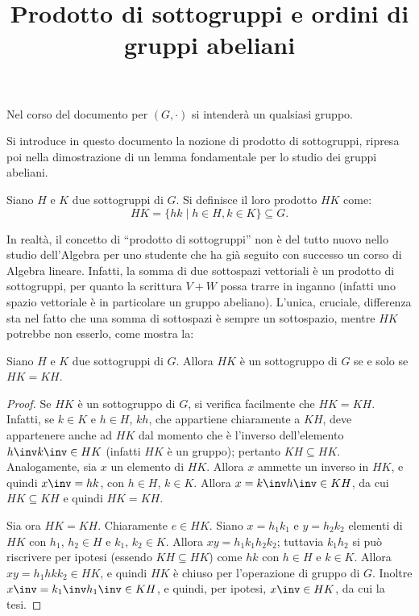 \documentclass[12pt]{scrartcl}
\begin{document}
	\title{Prodotto di sottogruppi e ordini di gruppi abeliani}
	\maketitle

	\begin{note}
		Nel corso del documento per $(G, \cdot)$ si intenderà un qualsiasi gruppo.
	\end{note}

	Si introduce in questo documento la nozione di prodotto
	di sottogruppi, ripresa poi nella dimostrazione di un
	lemma fondamentale per lo studio dei gruppi abeliani.
	
	\begin{definition}
		Siano $H$ e $K$ due sottogruppi di $G$. Si definisce
		il loro prodotto $HK$ come:
		\[ HK = \{ hk \mid h \in H, k \in K \} \subseteq G. \]
	\end{definition}

	In realtà, il concetto di ``prodotto di sottogruppi'' non
	è del tutto nuovo nello studio dell'Algebra per uno
	studente che ha già seguito con successo un corso di
	Algebra lineare. Infatti, la somma di due sottospazi
	vettoriali è un prodotto di sottogruppi, per quanto
	la scrittura $V+W$ possa trarre in inganno (infatti uno
	spazio vettoriale è in particolare un gruppo abeliano).
	L'unica, cruciale, differenza sta nel fatto che una
	somma di sottospazi è sempre un sottospazio, mentre
	$HK$ potrebbe non esserlo, come mostra la:
	
	\begin{proposition}
		Siano $H$ e $K$ due sottogruppi di $G$. Allora
		$HK$ è un sottogruppo di $G$ se e solo se $HK=KH$.
	\end{proposition}

	\begin{proof}
		Se $HK$ è un sottogruppo di $G$, si verifica
		facilmente che $HK=KH$. Infatti, se $k \in K$ e
		$h \in H$, $kh$, che appartiene chiaramente
		a $KH$, deve appartenere anche ad $HK$ dal momento
		che è l'inverso dell'elemento $h\inv k\inv \in HK$
		(infatti $HK$ è un gruppo); pertanto $KH \subseteq HK$.
		Analogamente, sia $x$ un elemento di $HK$. Allora
		$x$ ammette un inverso in $HK$, e quindi $x\inv = hk$,
		con $h \in H$, $k \in K$. Allora $x = k\inv h\inv \in KH$,
		da cui $HK \subseteq KH$ e quindi $HK=KH$. \bigskip
		
		
		Sia ora $HK=KH$. Chiaramente $e \in HK$. Siano $x=h_1 k_1$ e $y=h_2 k_2$ elementi
		di $HK$ con $h_1$, $h_2 \in H$ e $k_1$, $k_2 \in K$.
		Allora $xy = h_1 k_1 h_2 k_2$; tuttavia $k_1 h_2$ si può
		riscrivere per ipotesi (essendo $KH \subseteq HK$) come
		$hk$ con $h \in H$ e $k \in K$. Allora $xy = h_1 h k k_2 \in HK$, e quindi $HK$ è chiuso per l'operazione di gruppo di $G$.
		Inoltre $x\inv = k_1 \inv h_1 \inv \in KH$, e quindi,
		per ipotesi, $x\inv \in HK$, da cui la tesi.
	\end{proof}
\end{document}
